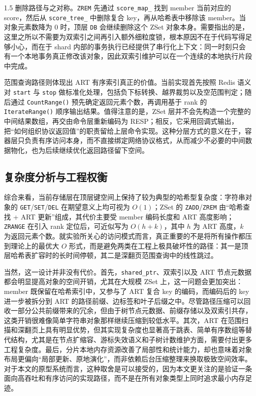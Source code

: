 \documentclass[a4paper,12pt,fontset=none,twoside]{article}
\numberwithin{figure}{section}
\numberwithin{equation}{section}
\numberwithin{table}{section}
\begin{document}
\begin{spacing}{1.5}
	删除路径与之对称。\texttt{ZREM} 先通过 \texttt{score\_map\_} 找到 member 当前对应的 score，然后从 \texttt{score\_tree\_} 中删除复合 key，再从哈希表中移除该 member。当对象元素数降为 0 时，顶层 \texttt{DB} 会继续删除这个 ZSet 对象本身。需要指出的是，这里之所以不需要为双索引之间再引入额外细粒度锁，根本原因不在于代码写得足够小心，而在于 shard 内部的事务执行已经提供了串行化上下文：同一时刻只会有一个本地事务真正修改该对象，因此双索引维护可以在一个连续的本地执行片段中完成。

	范围查询路径则体现出 ART 有序索引真正的价值。当前实现首先按照 Redis 语义对 \texttt{start} 与 \texttt{stop} 做标准化处理，包括负下标转换、越界裁剪以及空范围判定；随后通过 \texttt{CountRange()} 预先确定返回元素个数，再调用基于 rank 的 \texttt{IterateRange()} 顺序输出结果。值得注意的是，ZSet 层并不会先构造一个完整的中间结果数组，再交由命令层重新编码为 RESP；相反，它采用回调式输出，把“如何组织协议返回值”的职责留给上层命令实现。这种分层方式的意义在于，容器层只负责有序访问本身，而不直接绑定网络协议格式，从而减少不必要的中间数据物化，也为后续继续优化返回路径留下空间。

	\subsection{复杂度分析与工程权衡}

	综合来看，当前存储层在顶层键空间上保持了较为典型的哈希型复杂度：字符串对象的 \texttt{GET}/\texttt{SET}/\texttt{DEL} 在期望意义上均可视为 $O(1)$；ZSet 的 \texttt{ZADD}/\texttt{ZREM} 由“哈希查找 + ART 更新”组成，其代价主要受 member 编码长度和 ART 高度影响；\texttt{ZRANGE} 在引入 rank 定位后，可近似写为 $O(h + k)$，其中 $h$ 为 ART 高度，$k$ 为返回元素个数。就实验所关心的访问模式而言，真正重要的不是将所有操作都压到理论上的最优大 $O$ 形式，而是避免两类在工程上极具破坏性的路径：其一是顶层哈希表扩容时的长时间停顿，其二是深翻页范围查询中的线性跳过。

	当然，这一设计并非没有代价。首先，\texttt{shared\_ptr}、双索引以及 ART 节点元数据都会明显提高对象的空间开销，尤其在大规模 ZSet 上，这一问题会更加突出：member 既保留在哈希索引中，又参与了 ART 复合 key 的编码，而编码后的 key 进一步被拆分到 ART 的路径前缀、边标签和叶子后缀之中。尽管路径压缩可以回收一部分公共前缀带来的冗余，但由于树节点元数据、前缀存储以及双索引共存，这类开销很难像简单字符串对象那样继续压缩到较低水平。其次，ART 在范围扫描和深翻页上具有明显优势，但其实现复杂度也显著高于跳表、简单有序数组等替代结构，尤其是在节点扩缩容、游标失效语义和子树计数维护方面，需要付出更多工程复杂度。最后，分片本地内存资源改善了局部性和统计能力，却也意味着对象布局更偏向“局部更新、原地演化”，而非依赖后台压缩整理来换取极致空间效率。对于本文的原型系统而言，这种取舍是可以接受的，因为本文更关注的是验证一条面向高吞吐和有序访问的实现路径，而不是在所有对象类型上同时追求最小内存足迹。


\end{spacing}
\end{document}
